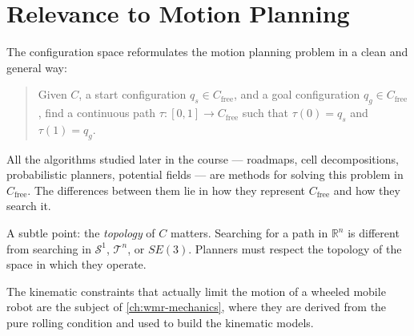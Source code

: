 \section{Relevance to Motion Planning}
\label{sec:cspace-motion-planning}

The configuration space reformulates the motion planning problem in
a clean and general way:

\begin{quote}
Given \( C \), a start configuration \( q_s \in C_{\text{free}} \),
and a goal configuration \( q_g \in C_{\text{free}} \), find a
continuous path \( \tau : [0, 1] \to C_{\text{free}} \) such that
\( \tau(0) = q_s \) and \( \tau(1) = q_g \).
\end{quote}

All the algorithms studied later in the course --- roadmaps, cell
decompositions, probabilistic planners, potential fields --- are
methods for solving this problem in \( C_{\text{free}} \). The
differences between them lie in how they represent \( C_{\text{free}} \)
and how they search it.

A subtle point: the \emph{topology} of \( C \) matters. Searching for
a path in \( \mathbb{R}^n \) is different from searching in
\( \mathcal{S}^1 \), \( \mathcal{T}^n \), or \( SE(3) \). Planners
must respect the topology of the space in which they operate.

The kinematic constraints that actually limit the motion of a wheeled
mobile robot are the subject of \cref{ch:wmr-mechanics}, where they
are derived from the pure rolling condition and used to build the
kinematic models.